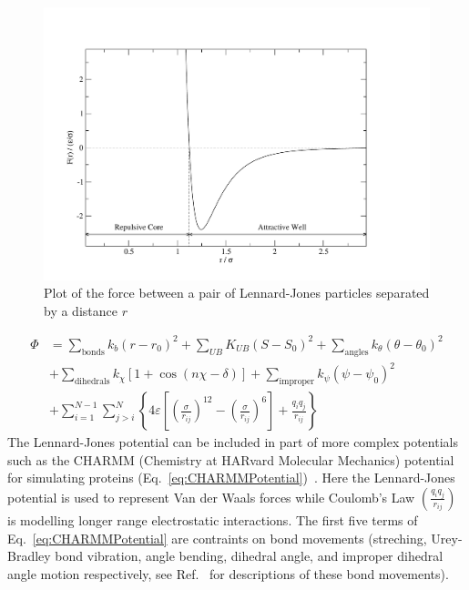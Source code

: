\documentclass[12pt]{UoAthesis}
\begin{document}
\begin{figure}[htp] 
  \begin{center}
    \includegraphics[clip,width=\textwidth]{figures/ljForce} 
    \caption{\label{fig:ljForce} Plot of the force between
      a pair of Lennard-Jones particles separated by a distance $r$}
  \end{center}
\end{figure}
\begin{align}
  \label{eq:CHARMMPotential}
  \Phi &= \sum_{\text{bonds}}k_b(r-r_0)^2  
  + \sum_{UB}K_{UB}(S-S_0)^2 
  + \sum_{\text{angles}}k_\theta(\theta - \theta_0)^2 \nonumber\\
  &+ \sum_{\text{dihedrals}} k_\chi[1+\cos(n\chi - \delta)] 
  + \sum_{\text{improper}} k_\psi(\psi - \psi_0)^2 \nonumber\\
  &+ \sum_{i=1}^{N-1}\sum_{j>i}^{N}\left\{ 4 \varepsilon 
    \left[ \left( \frac{\sigma}{r_{ij}} \right)^{12}
      -\left( \frac{\sigma}{r_{ij}} \right)^{6} \right] 
    + \frac{q_iq_j}{r_{ij}}\right\}
\end{align}
The Lennard-Jones potential can be included in part of more complex
potentials such as the CHARMM (Chemistry at HARvard Molecular
Mechanics) potential for simulating proteins
(Eq.~\eqref{eq:CHARMMPotential})~\cite{MacKerell1998}.  Here the
Lennard-Jones potential is used to represent Van der Waals forces
while Coulomb's Law $\left(\frac{q_iq_j}{r_{ij}}\right)$ is modelling
longer range electrostatic interactions.  The first five terms of
Eq.~\eqref{eq:CHARMMPotential} are contraints on bond movements
(streching, Urey-Bradley bond vibration, angle bending, dihedral
angle, and improper dihedral angle motion respectively, see
Ref.~\cite{Spoel2010} for descriptions of these bond movements).
\end{document}
